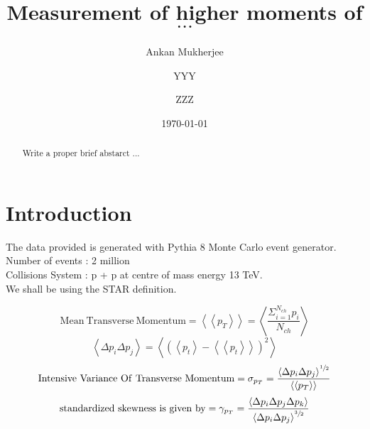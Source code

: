 \documentclass[letterpaper,aps,prc,superscriptaddress,nofootinbib,10pt,showpacs,floatfix]{revtex4-2}%
\newcommand{\bfrac}[2]{\frac{\displaystyle #1}{\displaystyle #2}}
\begin{document}
\title{ Measurement of higher moments of   $\cdots$}
\author{Ankan Mukherjee} 
\author{YYY}
\author{ZZZ}



\date{\today}  



\begin{abstract}

Write a proper brief abstarct ...
\end{abstract}

\maketitle

\section{Introduction}


The data provided is generated with Pythia 8  Monte Carlo event generator.\vspace{5 mm} \\
Number of events :  2 million \\
Collisions System :  p + p at centre of mass energy 13  TeV.\\



We shall be using the STAR definition. 

\begin{equation}
\label{eq:1}
\mathrm{Mean\ Transverse\ Momentum}=\left<\left<p_T\right>\right>=\left<\bfrac{\Sigma_{i=1}^{N_{ch}} p_i}{N_{ch}}\right>
\end{equation}
\vspace{-5mm}
\begin{equation}
\label{eq:2}
\left<\Delta p_i \Delta p_j\right>=\left<\left(\left<p_t\right>-\left<\left<p_t\right>\right>\right)^2\right>
\end{equation}
\vspace{-5mm}
\begin{equation}
\label{eq:3}
\mathrm{Intensive\ Variance\ Of\ Transverse\ Momentum}=\sigma_{p_T}=\bfrac{\left<\Delta p_i \Delta p_j\right>^{\sfrac{1}{2}}}{\left<\left<p_T\right>\right>}
\end{equation}
\begin{equation}
\label{eq:4}
\mathrm{standardized\ skewness\ is\ given\ by} = \gamma_{p_T}=\bfrac{\left<\Delta p_i \Delta p_j \Delta p_k\right>}{\left<\Delta p_i \Delta p_j\right>^{\sfrac{3}{2}}}
\end{equation}
\end{document}
